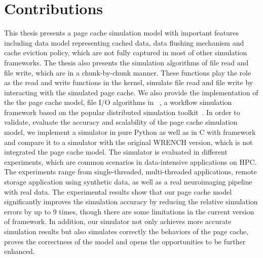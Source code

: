 \section{Contributions}

This thesis presents a page cache simulation model with important features 
including data model representing cached data, data flushing mechanism and 
cache eviction policy, which are not fully captured in most of other 
simulation frameworks. 
The thesis also presents the simulation algorithms of file read and file write, 
which are in a chunk-by-chunk manner. 
These functions play the role as the read and write functions in the kernel, 
simulate file read and file write by interacting with the simulated page cache.
We also provide the implementation of the the page cache model, 
file I/O algorithms in \wrench~\cite{casanova2020fgcs}, 
a workflow simulation framework based on the popular 
\simgrid distributed simulation toolkit~\cite{casanova2014simgrid}. 
In order to validate, evaluate the accuracy and scalability of the page cache 
simulation model, we implement a simulator in pure Python as well as 
in C with \wrench framework and compare it to a simulator with the original 
WRENCH version, which is not integrated the page cache model. 
The simulator is evaluated in different experiments, which are common 
scenarios in data-intensive applications on HPC.
The experiments range from single-threaded, multi-threaded applications, 
remote storage application using synthetic data, as well as a real neuroimaging 
pipeline with real data.
The experimental results show that our page cache model significantly improves 
the simulation accuracy by reducing the relative simulation errors by up to 9 times, 
though there are some limitations in the current version of \simgrid framework. 
In addition, our simulator not only achieves more accurate simulation results 
but also simulates correctly the behaviors of the page cache, proves the correctness 
of the model and opens the opportunities to be further enhanced. 


